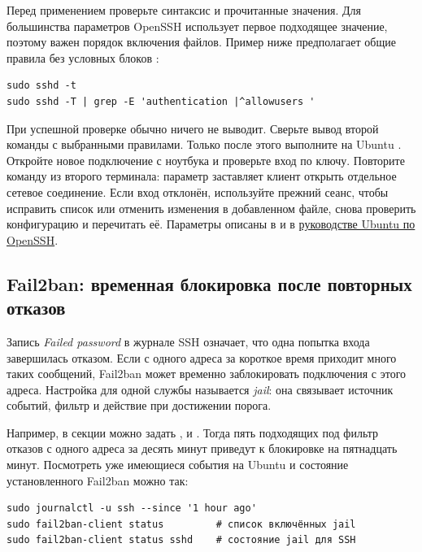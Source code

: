 Перед применением проверьте синтаксис и прочитанные значения. Для
большинства параметров OpenSSH использует первое подходящее значение,
поэтому важен порядок включения файлов. Пример ниже предполагает общие
правила без условных блоков :

\begin{verbatim}
sudo sshd -t
sudo sshd -T | grep -E 'authentication |^allowusers '
\end{verbatim}

При успешной проверке  обычно ничего не выводит.
Сверьте вывод второй команды с выбранными правилами. Только после
этого выполните на Ubuntu .
Откройте новое подключение с ноутбука и проверьте вход по ключу.
Повторите команду из второго терминала: параметр 
заставляет клиент открыть отдельное сетевое соединение.
Если вход отклонён, используйте прежний сеанс, чтобы исправить список
или отменить изменения в добавленном файле, снова проверить конфигурацию
и перечитать её. Параметры описаны в  и в
\href{https://ubuntu.com/server/docs/how-to/security/openssh-server/}{руководстве Ubuntu по OpenSSH}.

\subsection{Fail2ban: временная блокировка после повторных отказов}

Запись \emph{Failed password} в журнале SSH означает, что одна попытка
входа завершилась отказом. Если с одного адреса за короткое время
приходит много таких сообщений, Fail2ban может временно заблокировать
подключения с этого адреса. Настройка для одной службы называется
\emph{jail}: она связывает источник событий, фильтр и действие при
достижении порога.

Например, в секции \cmd{[sshd]} можно задать ,
 и . Тогда пять подходящих под
фильтр отказов с одного адреса за десять минут приведут к блокировке
на пятнадцать минут. Посмотреть уже имеющиеся события на Ubuntu и
состояние установленного Fail2ban можно так:

\begin{verbatim}
sudo journalctl -u ssh --since '1 hour ago'
sudo fail2ban-client status         # список включённых jail
sudo fail2ban-client status sshd    # состояние jail для SSH
\end{verbatim}

